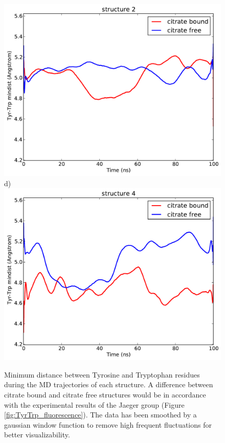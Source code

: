 \documentclass[english, a4paper, 12pt, titlepage, draft]{article}
\begin{document}
\begin{figure}
\begin{minipage}[]{0.45\linewidth}
        \includegraphics[width=\textwidth]{figures/TyrTrp/mindist_TyrTrp_structure1.pdf} 
        d)
        \includegraphics[width=\textwidth]{figures/TyrTrp/mindist_TyrTrp_structure3.pdf}  
    \end{minipage}
    \caption{Minimum distance between Tyrosine and Tryptophan residues during the MD trajectories of each structure.
        A difference between citrate bound and citrate free structures would be in accordance with the experimental results of the Jaeger group (Figure \ref{fig:TyrTrp_fluorescence}).
        The data has been smoothed by a gaussian window function to remove high frequent fluctuations for better visualizability.}
\label{fig:TyrTrp_distance}
\end{figure}  
\end{document}
